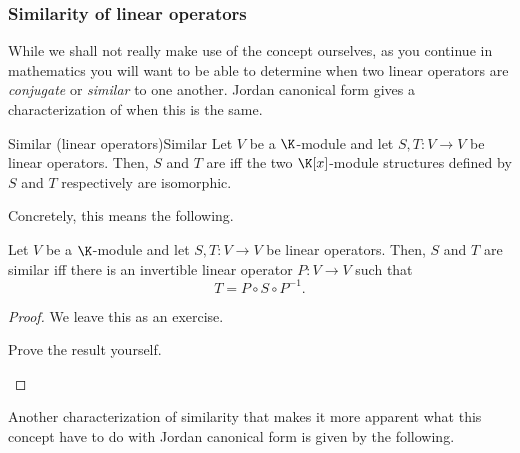 \subsubsection{Similarity of linear operators}

While we shall not really make use of the concept ourselves, as you continue in mathematics you will want to be able to determine when two linear operators are \emph{conjugate} or \emph{similar} to one another.  Jordan canonical form gives a characterization of when this is the same.
\begin{dfn}{Similar (linear operators)}{Similar}
	Let $V$ be a $\K$-module and let $S,T\colon V\rightarrow V$ be linear operators.  Then, $S$ and $T$ are  iff the two $\K [x]$-module structures defined by $S$ and $T$ respectively are isomorphic.
\end{dfn}
Concretely, this means the following.
\begin{prp}{}{}
	Let $V$ be a $\K$-module and let $S,T\colon V\rightarrow V$ be linear operators.  Then, $S$ and $T$ are similar iff there is an invertible linear operator $P\colon V\rightarrow V$ such that
	\begin{equation}
		T=P\circ S\circ P^{-1}.
	\end{equation}
	\begin{proof}
		We leave this as an exercise.
		\begin{exr}[breakable=false]{}{}
			Prove the result yourself.
		\end{exr}
	\end{proof}
\end{prp}
Another characterization of similarity that makes it more apparent what this concept have to do with Jordan canonical form is given by the following.
